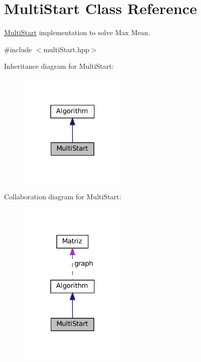 \hypertarget{classMultiStart}{}\section{Multi\+Start Class Reference}
\label{classMultiStart}


\hyperlink{classMultiStart}{Multi\+Start} implementation to solve Max Mean.  




{\ttfamily \#include $<$multi\+Start.\+hpp$>$}



Inheritance diagram for Multi\+Start\+:
\nopagebreak
\begin{figure}[H]
\begin{center}
\leavevmode
\includegraphics[width=145pt]{classMultiStart__inherit__graph}
\end{center}
\end{figure}


Collaboration diagram for Multi\+Start\+:
\nopagebreak
\begin{figure}[H]
\begin{center}
\leavevmode
\includegraphics[width=145pt]{classMultiStart__coll__graph}
\end{center}
\end{figure}
